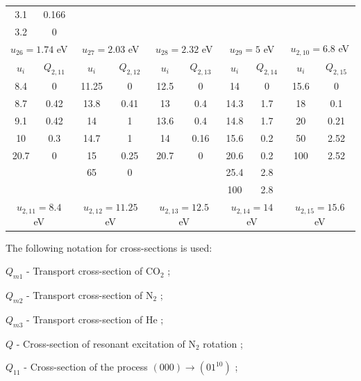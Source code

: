 \documentclass{report}
\begin{document}
\begin{table}
\begin{tabular}{|c|c||c|c||c|c||c|c||c|c|}
3.1  & 0.166  &       &       &       &       &      &      &      &       \\
3.2  & 0      &       &       &       &       &      &      &      &       \\
\multicolumn{2}{|c||}{$u_{26}=1.74$ eV} &
\multicolumn{2}{c||}{$u_{27}=2.03$ eV} &
\multicolumn{2}{c||}{$u_{28}=2.32$ eV} &
\multicolumn{2}{c||}{$u_{29}=5$ eV} &
\multicolumn{2}{c|}{$u_{2,10}=6.8$ eV}\\
\hline
\hline 
$u_i$ & $Q_{2,11}$ & $u_i$ & $Q_{2,12}$ & $u_i$ & $Q_{2,13}$ & $u_i$ & $Q_{2,14}$ & $u_i$ & $Q_{2,15}$ \\                                                                             
\hline
8.4  & 0      & 11.25 & 0     & 12.5  & 0     & 14   & 0    & 15.6 & 0     \\
8.7  & 0.42   & 13.8  & 0.41  & 13    & 0.4   & 14.3 & 1.7  & 18   & 0.1   \\
9.1  & 0.42   & 14    & 1     & 13.6  & 0.4   & 14.8 & 1.7  & 20   & 0.21  \\
10   & 0.3    & 14.7  & 1     & 14    & 0.16  & 15.6 & 0.2  & 50   & 2.52  \\
20.7 & 0      & 15    & 0.25  & 20.7  & 0     & 20.6 & 0.2  & 100  & 2.52  \\
     &        & 65    & 0     &       &       & 25.4 & 2.8  &      &       \\
     &        &       &       &       &       & 100  & 2.8  &      &       \\
\multicolumn{2}{|c||}{$u_{2,11}=8.4$ eV} &
\multicolumn{2}{c||}{$u_{2,12}=11.25$ eV} &
\multicolumn{2}{c||}{$u_{2,13}=12.5$ eV} &
\multicolumn{2}{c||}{$u_{2,14}=14$ eV} &
\multicolumn{2}{c|}{$u_{2,15}=15.6$ eV}\\
\hline 
\end{tabular}
\end{table}

The following notation for cross-sections is used:

$Q_{m1}$ - Transport cross-section of {CO$_2$} \cite{Lowke-1973};

$Q_{m2}$ - Transport cross-section of {N$_2$} \cite{Frost-1962};

$Q_{m3}$ - Transport cross-section of He \cite{Lowke-1973};

$Q$ - Cross-section of resonant excitation of {N$_2$} rotation  \cite{Oksyuk-1966,Chandra-1973};

$Q_{11}$ - Cross-section of the process $(000)\rightarrow(01^10)$  \cite{Lowke-1973};
\end{document}
